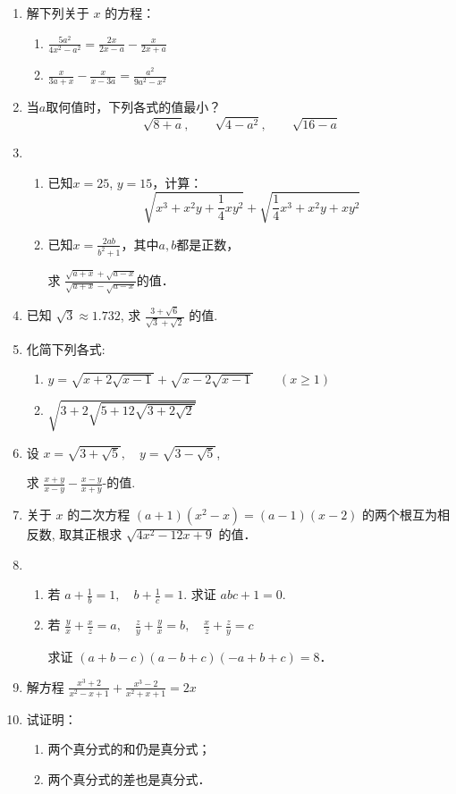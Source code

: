 \begin{enumerate}
\item 解下列关于 $x$ 的方程：
\begin{enumerate}
\item $\frac{5 a^{2}}{4 x^{2}-a^{2}}=\frac{2 x}{2 x-a}-\frac{x}{2 x+a}$
\item $\frac{x}{3 a+x}-\frac{x}{x-3 a}=\frac{a^{2}}{9 a^{2}-x^{2}}$
\end{enumerate}

\item 当$a$取何值时，下列各式的值最小？
\[\sqrt{8+a},\qquad \sqrt{4-a^2},\qquad \sqrt{16-a}  \]

\item \begin{enumerate}
    \item 已知$x=25$, $y=15$，计算：
    \[\sqrt{x^3+x^2y+\frac{1}{4}xy^2}+\sqrt{\frac{1}{4}x^3+x^2y+xy^2} \]
    \item 已知$x=\frac{2ab}{b^2+1}$，其中$a,b$都是正数，
    
    求 $\frac{\sqrt{a+x}+\sqrt{a-x}}{\sqrt{a+x}-\sqrt{a-x}}$的值．
\end{enumerate}

\item 已知 $\sqrt{3} \approx 1.732$, 求 $\frac{3+\sqrt{6}}{\sqrt{3}+\sqrt{2}}$ 的值.
\item 化简下列各式:
\begin{enumerate}
    \item $y=\sqrt{x+2 \sqrt{x-1}}+\sqrt{x-2 \sqrt{x-1}}\qquad (x \geqslant 1)$
    \item $\sqrt{3+2 \sqrt{5+12 \sqrt{3+2 \sqrt{2}}}}$
\end{enumerate}

\item 设 $x=\sqrt{3+\sqrt{5}},\quad  y=\sqrt{3-\sqrt{5}}$,

求 $\frac{x+y}{x-y}-\frac{x-y}{x+y}$-的值.
\item 关于 $x$ 的二次方程 $(a+1)\left(x^{2}-x\right)=(a-1)(x-2)$
的两个根互为相反数, 取其正根求 $\sqrt{4 x^{2}-12 x+9}$ 的值．
\item 
\begin{enumerate}
    \item 若 $a+\frac{1}{b}=1, \quad b+\frac{1}{c}=1$. 求证 $a b c+1=0$.
    \item 若 $\frac{y}{x}+\frac{x}{z}=a,\quad  \frac{z}{y}+\frac{y}{x}=b,\quad  \frac{x}{z}+\frac{z}{y}=c$
    
求证 $(a+b-c)(a-b+c)(-a+b+c)=8$．
\end{enumerate}


\item 解方程 $\frac{x^{3}+2}{x^{2}-x+1}+\frac{x^{3}-2}{x^{2}+x+1}=2 x$
\item 试证明：
\begin{enumerate}
    \item 两个真分式的和仍是真分式；
    \item 两个真分式的差也是真分式．
\end{enumerate}

\end{enumerate}

